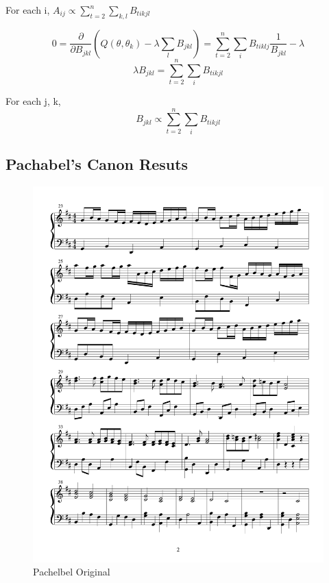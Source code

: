 \documentclass{article} %
\begin{document}
For each i, $A_{ij} \propto \sum_{t=2}^n \sum_{k,l} B_{tikjl}$ \newline

$$ 0 = \frac{\partial}{\partial B_{jkl}} (Q(\theta, \theta_k) - \lambda \sum_l B_{jkl}) = \sum_{t=2}^n \sum_i B_{tiklj} \frac{1}{B_{jkl}} - \lambda$$
$$ \lambda B_{jkl} = \sum_{t=2}^n \sum_i B_{tikjl}$$

For each j, k, \newline
$$B_{jkl} \propto \sum_{t=2}^n \sum_i B_{tikjl}$$

\subsection{Pachabel's Canon Resuts}

\begin{figure}[H]
\centering

\includegraphics [scale = 0.6] {PachelbelOriginal-cropped.pdf}
\caption{Pachelbel Original\label{Porig}}
\end{figure}
\end{document}
